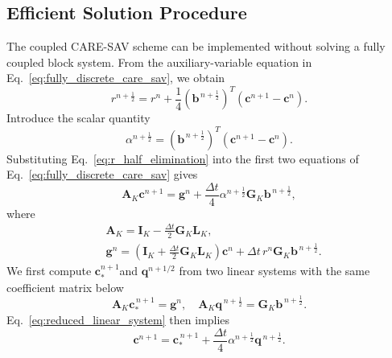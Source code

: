 \documentclass[10pt,reqno]{amsart}
\theoremstyle{remark}
\theoremstyle{definition}
\begin{document}
\subsection{Efficient Solution Procedure}
The coupled CARE-SAV scheme can be implemented without solving a fully coupled block system. From the auxiliary-variable equation in Eq.~\eqref{eq:fully_discrete_care_sav}, we obtain
\begin{equation}
  r^{n+\frac12} = r^n + \frac14 \left(\boldsymbol b^{\,n+\frac12}\right)^{T} \left(\boldsymbol c^{n+1}-\boldsymbol c^n\right).
\label{eq:r_half_elimination}
\end{equation}
Introduce the scalar quantity
\begin{equation}
  \alpha^{n+\frac{1}{2}} =\left(\boldsymbol {b}^{\,n+\frac{1}{2}}\right)^{T}\left(\boldsymbol c^{n+1}-\boldsymbol c^n\right).
\end{equation}
Substituting Eq.~\eqref{eq:r_half_elimination} into the first two equations of Eq.~\eqref{eq:fully_discrete_care_sav} gives
\begin{equation}
  \boldsymbol{A}_K\boldsymbol{c}^{n+1} = \boldsymbol{g}^n + \frac{\Delta t}{4} \alpha^{n+\frac12} \boldsymbol{G}_K\boldsymbol b^{\,n+\frac12},
\label{eq:reduced_linear_system}
\end{equation}
where
\begin{equation}
\begin{aligned}
&\boldsymbol{A}_K = \boldsymbol{I}_K - \frac{\Delta t}{2}\boldsymbol{G}_K\boldsymbol{L}_K,
\\
&\boldsymbol g^n = \left( \boldsymbol{I}_K + \frac{\Delta t}{2}\boldsymbol{G}_K\boldsymbol{L}_K \right)\boldsymbol c^n + \Delta t\,r^n \boldsymbol{G}_K\boldsymbol b^{\,n+\frac12}.
\end{aligned}
\label{eq:efficient_solver_definitions}
\end{equation}
We first compute $\boldsymbol{c}_{*}^{n+1}$and $\boldsymbol{q}^{n+1/2}$ from two linear systems with the same coefficient matrix below
\begin{equation}
  \boldsymbol{A}_K\boldsymbol c_*^{\,n+1} = \boldsymbol g^n, \quad
  \boldsymbol{A}_K\boldsymbol q^{\,n+\frac12}=\boldsymbol{G}_K\boldsymbol b^{\,n+\frac12}.
\label{eq:two_linear_solves}
\end{equation}
Eq.~\eqref{eq:reduced_linear_system} then implies
\begin{equation}
  \boldsymbol c^{n+1} = \boldsymbol c_*^{\,n+1} + \frac{\Delta t}{4} \alpha^{n+\frac12}\boldsymbol q^{\,n+\frac12}.
\label{eq:c_solution_decomposition}
\end{equation}
\end{document}
